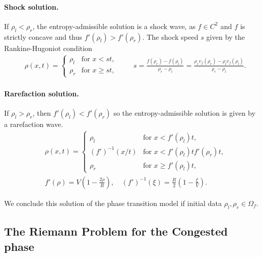 \documentclass[10pt]{article}
\numberwithin{equation}{section}
\begin{document}
\paragraph{Shock solution.} If $\rho_l < \rho_r$, the entropy-admissible solution is a shock wave, as $f \in C^2$ and $f$ is strictly concave and thus $f'(\rho_l) > f'(\rho_r) $. The shock speed $s$ given by the Rankine-Hugoniot condition
\begin{align*}
    & \rho(x,t) = \begin{cases}
    \rho_l & \text{for $x < st$, } \\
    \rho_r & \text{for $x \geq st$, }
    \end{cases} 
    \quad \quad s = \frac{f(\rho_r) - f(\rho_l)}{\rho_r - \rho_l} = \frac{\rho_r v_f(\rho_r) -\rho_l v_f(\rho_l)}{\rho_r - \rho_l}.
\end{align*}

\paragraph{Rarefaction solution.} If $\rho_l > \rho_r$, then $f'(\rho_l) < f'(\rho_r) $ so the entropy-admissible solution is given by a rarefaction wave.
\begin{align*}
    & \rho(x,t) = \begin{cases}
    \rho_l & \text{for $x < f'(\rho_l)t$, } \\
    (f')^{-1}(x/t)  &  \text{for $x < f'(\rho_l)t f'(\rho_r)t$,} \\
     \rho_r & \text{for $x \geq f'(\rho_l)t$, }
    \end{cases} \\
    & f'(\rho) = V(1-\frac{2 \rho}{R}) , \quad  (f')^{-1}(\xi) = \frac{R}{2}(1-\frac{\xi}{V}). 
\end{align*}

We conclude this solution of the phase transition model if initial data $\rho_l, \rho_r \in \Omega_f$.

\begin{figure} \centering
    
\end{figure}


\subsection{The Riemann Problem for the Congested phase}\label{RPCongPh}
\end{document}
